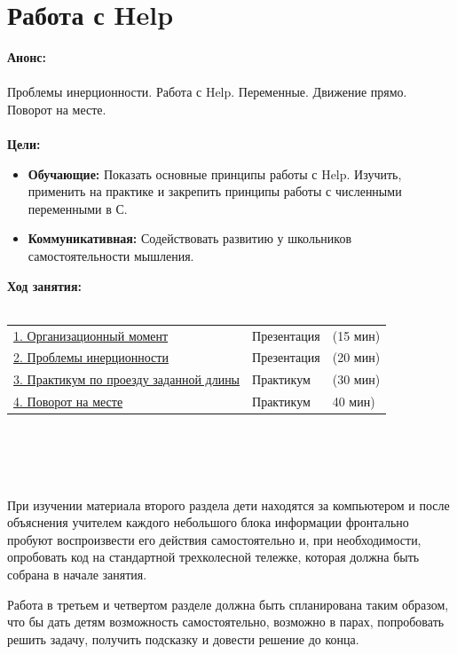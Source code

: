 \chapter{\label{lesson11}Работа с Help}
{\bfseries Анонс:}\\\\
Проблемы инерционности. Работа с Help. Переменные. Движение прямо. Поворот на месте.\\\\
{\bfseries Цели:}
\begin{itemize}
	\item{}{\bfseries Обучающие:} Показать основные принципы работы с Help. Изучить, применить на практике и закрепить принципы работы с численными переменными в С.
	\item{}{\bfseries Коммуникативная:} Содействовать развитию у школьников самостоятельности мышления.\\
\end{itemize}	
{\bfseries Ход занятия:}\\\\
\begin{tabular}{lll}
	\hyperlink{lesson11x1}{1. Организационный момент} & Презентация & (15 мин)\\
	\hyperlink{lesson11x2}{2. Проблемы инерционности} & Презентация & (20 мин) \\
	\hyperlink{lesson11x3}{3. Практикум по проезду заданной длины} & Практикум & (30 мин) \\
	\hyperlink{lesson11x4}{4. Поворот на месте} & Практикум & 40 мин)\\
\end{tabular}\\\\

{\hypertarget{lesson11x1}{}}\\\\ 

При изучении материала второго  раздела дети находятся за компьютером и после объяснения учителем каждого небольшого блока информации фронтально пробуют воспроизвести его действия самостоятельно и, при необходимости, опробовать код на стандартной трехколесной тележке, которая должна быть собрана в начале занятия.

Работа в третьем и четвертом разделе должна быть спланирована таким образом, что бы дать детям возможность самостоятельно, возможно в парах, попробовать решить задачу, получить подсказку и довести решение до конца.\\\\

